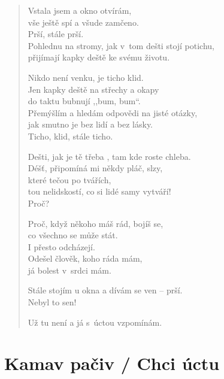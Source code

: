 \begin{verse}
Vstala jsem  a okno otvírám, \\
vše ještě spí a všude zamčeno. \\
Prší, stále prší. \\
Pohlednu na stromy, jak v tom dešti stojí potichu, \\
přijímají kapky deště ke svému životu.

\medskip

Nikdo není venku, je ticho klid. \\
Jen kapky deště  na střechy a okapy \\
\hspace{\fill}do taktu bubnují ,,bum, bum``. \\
Přemýšlím a  hledám odpovědi na jisté otázky, \\
jak smutno je bez lidí a bez lásky. \\
Ticho, klid, stále ticho.

\medskip

Dešti, jak je tě třeba , tam kde roste chleba. \\
Déšť, připomíná mi někdy pláč, slzy, \\ 
\hspace{\fill}které tečou po tvářích, \\
tou nelidskostí, co si lidé samy vytváří! \\
Proč?

\medskip

Proč, když někoho máš rád, bojíš se, \\
\hspace{\fill}co všechno se může stát. \\
I přesto odcházejí. \\
Odešel člověk, koho ráda mám, \\
já bolest v srdci mám.

\medskip

Stále stojím u okna a dívám se ven -- prší. \\
Nebyl to sen!

\medskip

Už tu není a já s úctou vzpomínám.
\end{verse}


\section{Kamav pačiv / Chci  úctu}

